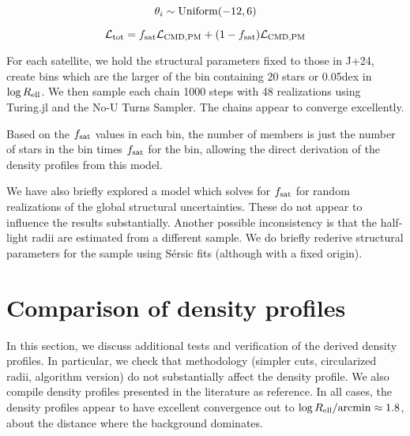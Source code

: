 \begin{equation}{
\theta_i \sim {\rm Uniform}(-12, 6)
}\end{equation}

\begin{equation}{
{\cal L}_{\rm tot} = f_{\rm sat}{\cal L}_{\rm CMD, PM} + (1-f_{\rm sat}){\cal L}_{\rm CMD, PM}
}\end{equation}

For each satellite, we hold the structural parameters fixed to those in
J+24, create bins which are the larger of the bin containing 20 stars or
0.05dex in \(\log R_{\rm ell}\). We then sample each chain 1000 steps
with 48 realizations using Turing.jl and the No-U Turns Sampler. The
chains appear to converge excellently.

Based on the \(f_{\rm sat}\) values in each bin, the number of members
is just the number of stars in the bin times \(f_{\rm sat}\) for the
bin, allowing the direct derivation of the density profiles from this
model.

We have also briefly explored a model which solves for \(f_{\rm sat}\)
for random realizations of the global structural uncertainties. These do
not appear to influence the results substantially. Another possible
inconsistency is that the half-light radii are estimated from a
different sample. We do briefly rederive structural parameters for the
sample using Sérsic fits (although with a fixed origin).

\section{Comparison of density profiles}\label{sec:density_extra}

In this section, we discuss additional tests and verification of the
derived density profiles. In particular, we check that methodology
(simpler cuts, circularized radii, algorithm version) do not
substantially affect the density profile. We also compile density
profiles presented in the literature as reference. In all cases, the
density profiles appear to have excellent convergence out to
\(\log R_{\rm ell} / {\rm arcmin} \approx 1.8\), about the distance
where the background dominates.

